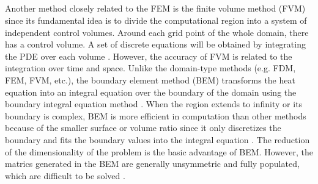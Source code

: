 \subsection{}


Another method closely related to the FEM is the finite volume method (FVM) since its fundamental idea is to divide the computational region into a system of independent control volumes. Around each grid point of the whole domain, there has a control volume. A set of discrete equations will be obtained by integrating the PDE over each volume \cite{eymard2000finite}. However, the accuracy of FVM is related to the integration over time and space. Unlike the domain-type methods
(e.g. FDM, FEM, FVM, etc.), the boundary element method (BEM) transforms the heat equation into an integral equation over the
boundary of the domain using the boundary integral equation method
\cite{attaway1991boundary}. When the region extends to infinity or its
boundary is complex, BEM is more efficient in computation than other
methods because of the smaller surface or volume ratio
\cite{katsikadelis2002boundary} since it only discretizes the boundary
and fits the boundary values into the integral equation
\cite{ang2007beginner}. The reduction of the dimensionality of the problem is the basic advantage of BEM. However, the matrics generated in the BEM are
generally unsymmetric and fully populated, which are difficult to be
solved \cite{mushtaq2010advantages}.




